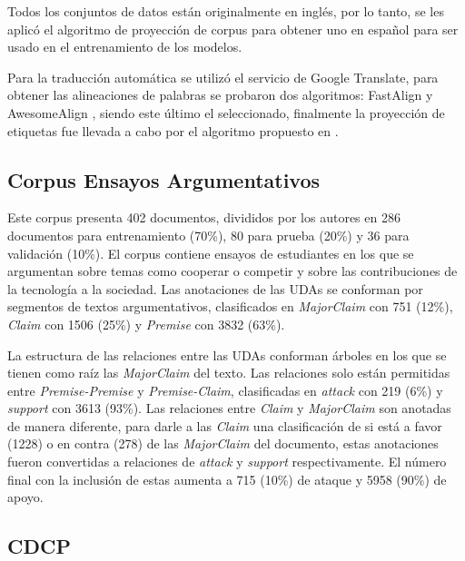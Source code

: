\documentclass[a4paper,11pt,twocolumn,twoside]{article}
\begin{document}
Todos los conjuntos de datos están originalmente en inglés, por lo tanto, se les aplicó el algoritmo de proyección
de corpus para obtener uno en español para ser usado en el entrenamiento de los modelos.

Para la traducción automática se utilizó el servicio de Google Translate, 
para obtener las alineaciones de palabras se probaron dos algoritmos: FastAlign \cite{dyer2013fastalign} y AwesomeAlign 
\cite{dou2021word}, siendo este último el seleccionado, finalmente la proyección de etiquetas
fue llevada a cabo por el algoritmo propuesto en \cite{eger2018cross}.


\subsection{Corpus Ensayos Argumentativos}\label{corpus:persuasive_essays}

Este corpus \cite{stab2017parsing} presenta 402 documentos, divididos por los autores en 286 documentos para entrenamiento (70\%), 
80 para prueba (20\%) y 36 para validación (10\%). El corpus contiene ensayos de estudiantes en los que 
se argumentan sobre temas como cooperar o competir y sobre las contribuciones de la tecnología a la sociedad.
Las anotaciones de las UDAs se conforman por segmentos de textos argumentativos,
clasificados en \textit{MajorClaim} con 751 (12\%), \textit{Claim} con 1506 (25\%) y \textit{Premise} con 3832 (63\%).

La estructura de las relaciones entre las UDAs conforman árboles en los que se tienen como raíz las 
\textit{MajorClaim} del texto. Las relaciones solo están permitidas entre \textit{Premise-Premise} y \textit{Premise-Claim}, clasificadas
en \textit{attack} con 219 (6\%) y \textit{support} con 3613 (93\%). Las relaciones entre \textit{Claim} y \textit{MajorClaim} son anotadas 
de manera diferente, para 
darle a las \textit{Claim} una clasificación de si está a favor (1228) o en contra (278) de las \textit{MajorClaim} del documento,
estas anotaciones fueron convertidas a relaciones de \textit{attack} y \textit{support} respectivamente. El número final con la inclusión de estas aumenta a 715 (10\%) de ataque y 
5958 (90\%) de apoyo.

\subsection{CDCP}\label{corpus:cdcp}
\end{document}

